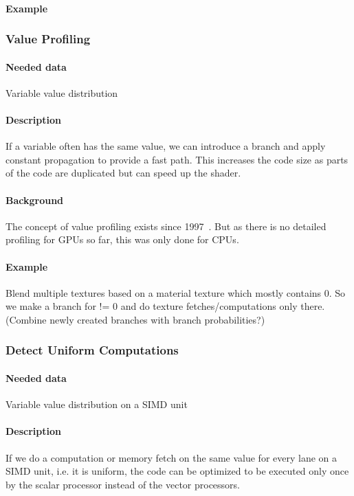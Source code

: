 \paragraph{Example}

\subsubsection{Value Profiling}
\paragraph{Needed data} Variable value distribution
\paragraph{Description} If a variable often has the same value, we can introduce a branch and apply constant propagation to provide a fast path. This increases the code size as parts of the code are duplicated but can speed up the shader.
\paragraph{Background} The concept of value profiling exists since 1997~\cite{Calder1997}. But as there is no detailed profiling for GPUs so far, this was only done for CPUs.
\paragraph{Example} Blend multiple textures based on a material texture which mostly contains 0. So we make a branch for != 0 and do texture fetches/computations only there. (Combine newly created branches with branch probabilities?)

\subsubsection{Detect Uniform Computations}
\paragraph{Needed data} Variable value distribution on a SIMD unit
\paragraph{Description} If we do a computation or memory fetch on the same value for every lane on a SIMD unit, i.e. it is uniform, the code can be optimized to be executed only once by the scalar processor instead of the vector processors.
